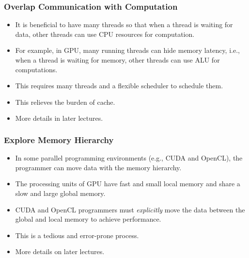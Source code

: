 \documentclass{beamer}
\begin{document}
\begin{CJK}{UTF8}{bsmi}
\begin{frame}
\frametitle{Overlap Communication with Computation}
\begin{itemize}
\item It is beneficial to have many threads so that when a thread is waiting for data, other threads can use CPU resources for computation.
\item For example, in GPU, many running threads can hide memory latency, i.e., when a thread is waiting for memory, other threads can use ALU for computations.
\item This requires many threads and a flexible scheduler to schedule them.  
\item This relieves the burden of cache.
\item More details in later lectures.
\end{itemize}
\end{frame}

\begin{frame}
\frametitle{Explore Memory Hierarchy}
\begin{itemize}
\item In some parallel programming environments (e.g., CUDA and OpenCL), the programmer can move data with the memory hierarchy.
\item The processing units of GPU have fast and small local memory and share a slow and large global memory.
\item CUDA and OpenCL programmers must {\em explicitly} move the data between the global and local memory to achieve performance.  
\item This is a tedious and error-prone process.
\item More details on later lectures.
\end{itemize}
\end{frame}

\end{CJK}
\end{document}

